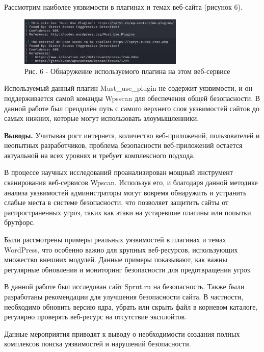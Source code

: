 Рассмотрим наиболее уязвимости в плагинах и темах веб-сайта (рисунок 6).

\begin{figure}[H]
	\centering
	\includegraphics[width=0.7\textwidth]{media/ict/image39}
	\caption*{Рис. 6 - Обнаружение используемого плагина на этом веб-сервисе}
\end{figure}

\begin{multicols}{2}
Используемый данный плагин Must\_use\_plugin не содержит уязвимости, и
он поддерживается самой команды Wpsscan для обеспечения общей
безопасности. В данной работе был преодолён путь с самого верхнего слоя
уязвимостей сайтов до самых нижних, которые могут использовать
злоумышленники.

{\bfseries Выводы.} Учитывая рост интернета, количество веб-приложений,
пользователей и неопытных разработчиков, проблема безопасности
веб-приложений остается актуальной на всех уровнях и требует
комплексного подхода.

В процессе научных исследований проанализирован мощный инструмент
сканирования веб-сервисов Wpscan. Используя его, и благодаря данной
методике анализа уязвимостей администраторы могут вовремя обнаружить и
устранить слабые места в системе безопасности, что позволяет защитить
сайты от распространенных угроз, таких как атаки на устаревшие плагины
или попытки брутфорс.

Были рассмотрены примеры реальных уязвимостей в плагинах и темах
WordPress, что особенно важно для крупных веб-ресурсов, использующих
множество внешних модулей. Данные примеры показывают, как важны
регулярные обновления и мониторинг безопасности для предотвращения
угроз.

В данной работе был исследован сайт Sprut.ru на безопасность. Также были
разработаны рекомендации для улучшения безопасности сайта. В частности,
необходимо обновить версию ядра, убрать или скрыть файл в корневом
каталоге, регулярно проверять веб-ресурс на отсутствие эксплойтов.

Данные мероприятия приводят к выводу о необходимости создания полных
комплексов поиска уязвимостей и нарушений безопасности.
\end{multicols}

